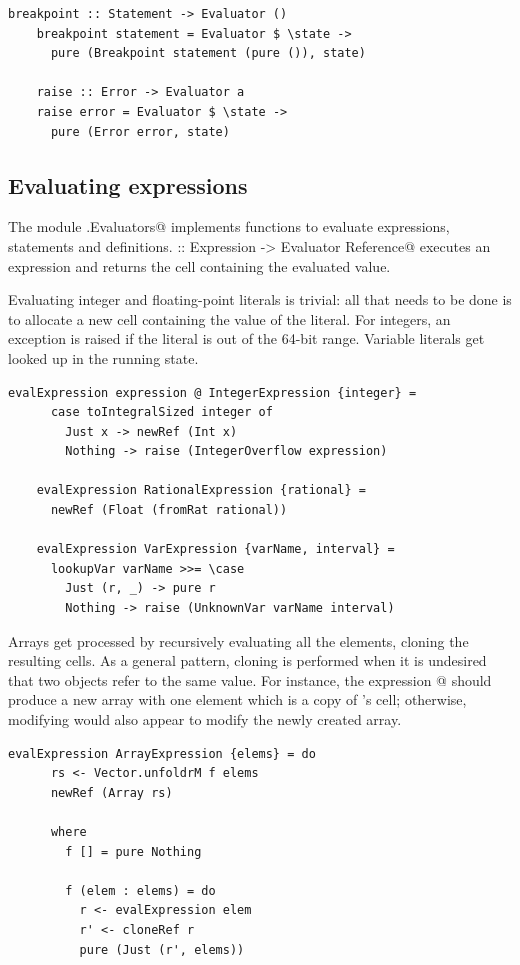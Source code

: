 \documentclass[UdineBachThesis,american,11pt]{PhdThesis}
\begin{document}
  \begin{lstlisting}[gobble=4,basicstyle=\ttfamily\small]
    breakpoint :: Statement -> Evaluator ()
    breakpoint statement = Evaluator $ \state ->
      pure (Breakpoint statement (pure ()), state)

    raise :: Error -> Evaluator a
    raise error = Evaluator $ \state ->
      pure (Error error, state)
  \end{lstlisting}

  \subsection{Evaluating expressions}

  The module \lstinline@Devin.Evaluators@ implements functions to evaluate
  expressions, statements and definitions.
  \lstinline@evalExpression :: Expression -> Evaluator Reference@ executes an
  expression and returns the cell containing the evaluated value.

  Evaluating integer and floating-point literals is trivial: all that needs to
  be done is to allocate a new cell containing the value of the literal. For
  integers, an exception is raised if the literal is out of the 64-bit range.
  Variable literals get looked up in the running state.

  \begin{lstlisting}[gobble=4,basicstyle=\ttfamily\small]
    evalExpression expression @ IntegerExpression {integer} =
      case toIntegralSized integer of
        Just x -> newRef (Int x)
        Nothing -> raise (IntegerOverflow expression)

    evalExpression RationalExpression {rational} =
      newRef (Float (fromRat rational))

    evalExpression VarExpression {varName, interval} =
      lookupVar varName >>= \case
        Just (r, _) -> pure r
        Nothing -> raise (UnknownVar varName interval)
  \end{lstlisting}

  Arrays get processed by recursively evaluating all the elements, cloning the
  resulting cells. As a general pattern, cloning is performed when it is
  undesired that two objects refer to the same value. For instance, the
  expression \lstinline@[x]@ should produce a new array with one element which
  is a copy of \lstinline@x@'s cell; otherwise, modifying \lstinline@x@ would
  also appear to modify the newly created array.

  \begin{lstlisting}[gobble=4,basicstyle=\ttfamily\small]
    evalExpression ArrayExpression {elems} = do
      rs <- Vector.unfoldrM f elems
      newRef (Array rs)

      where
        f [] = pure Nothing

        f (elem : elems) = do
          r <- evalExpression elem
          r' <- cloneRef r
          pure (Just (r', elems))
  \end{lstlisting}
\end{document}
